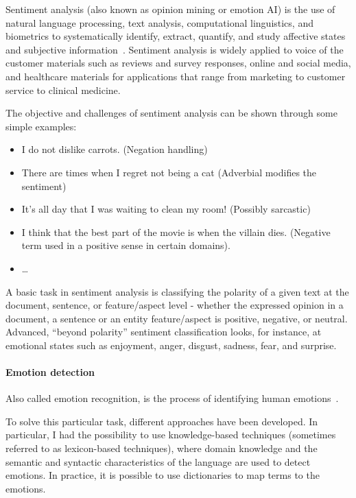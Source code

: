 Sentiment analysis (also known as opinion mining or emotion AI) is the use of natural language processing, text analysis, computational linguistics, and biometrics to systematically identify, extract, quantify, and study affective states and subjective information~\cite{enwiki:1024880646}. Sentiment analysis is widely applied to voice of the customer materials such as reviews and survey responses, online and social media, and healthcare materials for applications that range from marketing to customer service to clinical medicine.

The objective and challenges of sentiment analysis can be shown through some simple examples:
\begin{itemize}
	\item I do not dislike carrots. (Negation handling)
	\item There are times when I regret not being a cat (Adverbial modifies the sentiment)
	\item It's all day that I was waiting to clean my room! (Possibly sarcastic)
	\item I think that the best part of the movie is when the villain dies. (Negative term used in a positive sense in certain domains).
	\item \ldots
\end{itemize}

A basic task in sentiment analysis is classifying the polarity of a given text at the document, sentence, or feature/aspect level - whether the expressed opinion in a document, a sentence or an entity feature/aspect is positive, negative, or neutral. Advanced, “beyond polarity” sentiment classification looks, for instance, at emotional states such as enjoyment, anger, disgust, sadness, fear, and surprise.

\paragraph{Emotion detection}

Also called emotion recognition, is the process of identifying human emotions~\cite{enwiki:1023798177}. 

To solve this particular task, different approaches have been developed. In particular, I had the possibility to use knowledge-based techniques (sometimes referred to as lexicon-based techniques), where domain knowledge and the semantic and syntactic characteristics of the language are used to detect emotions. In practice, it is possible to use dictionaries to map  terms to the emotions. 

